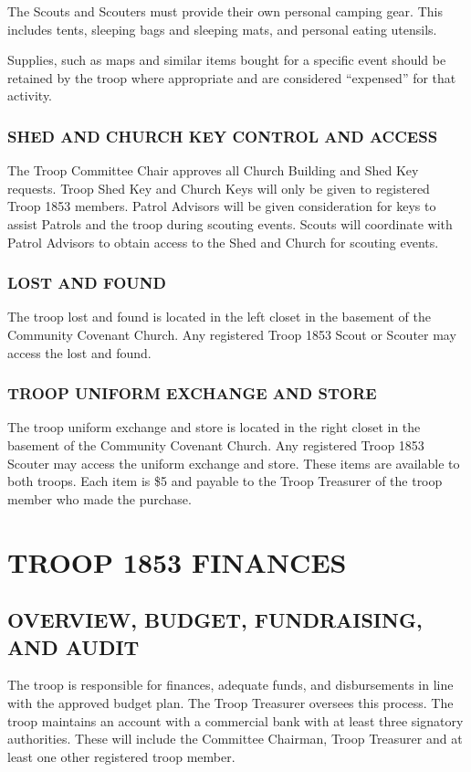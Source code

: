 \documentclass{ltxguide}
\begin{document}
The Scouts and Scouters must provide their own personal camping gear. This includes tents, sleeping bags and sleeping mats, and personal eating utensils.

Supplies, such as maps and similar items bought for a specific event should be retained by the troop where appropriate and are considered “expensed” for that activity.

\subsubsection{SHED AND CHURCH KEY CONTROL AND ACCESS}
The Troop Committee Chair approves all Church Building and Shed Key requests. Troop Shed Key and Church Keys will only be given to registered Troop 1853 members. Patrol Advisors will be given consideration for keys to assist Patrols and the troop during scouting events. Scouts will coordinate with Patrol Advisors to obtain access to the Shed and Church for scouting events.

\subsubsection{LOST AND FOUND}
The troop lost and found is located in the left closet in the basement of the Community Covenant Church. Any registered Troop 1853 Scout or Scouter may access the lost and found.

\subsubsection{TROOP UNIFORM EXCHANGE AND STORE}
The troop uniform exchange and store is located in the right closet in the basement of the Community Covenant Church. Any registered Troop 1853 Scouter may access the uniform exchange and store. These items are available to both troops. Each item is \$5 and payable to the Troop Treasurer of the troop member who made the purchase.

\section{TROOP 1853 FINANCES}
\subsection{OVERVIEW, BUDGET, FUNDRAISING, AND AUDIT}
The troop is responsible for finances, adequate funds, and disbursements in line with the approved budget plan. The Troop Treasurer oversees this process. The troop maintains an account with a commercial bank with at least three signatory authorities. These will include the Committee Chairman, Troop Treasurer and at least one other registered troop member.
\end{document}
